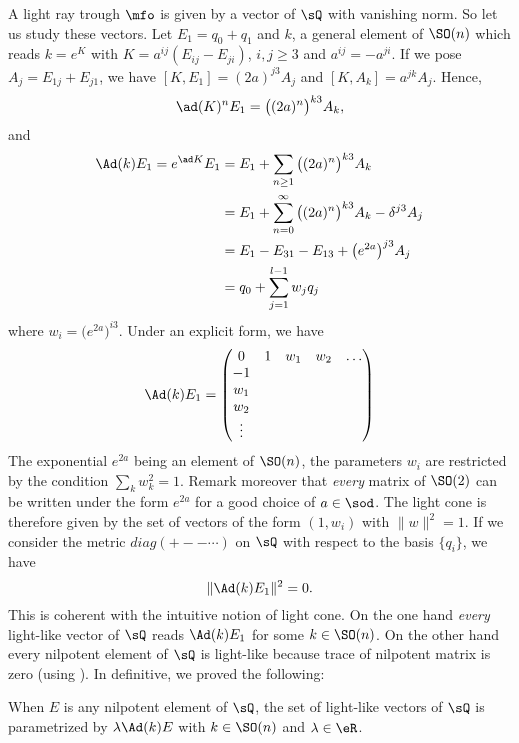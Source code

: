 A light ray trough $\mfo$ is given by a vector of $\sQ$ with vanishing norm. So let us study these vectors. Let $E_1=q_0+q_1$ and $k$, a general element of  $\SO(n)$ which reads $k= e^{K}$ with $K=a^{ij}(E_{ij}-E_{ji})$, $i,j\geq 3$ and $a^{ij}=-a^{ji}$.  If we pose $A_j=E_{1j}+E_{j1}$, we have $[K,E_1]=(2a)^{j3}A_j$ and $[K,A_k]=a^{jk}A_j$. Hence,
\[
\ad(K)^nE_1=\big((2a)^n\big)^{k3}A_k,
\]
and
\begin{equation} \label{eq:Adkeu}
\begin{split}
\Ad(k)E_1=e^{\ad K}E_1&=E_1+\sum_{n\geq 1}\big( (2a)^n\big)^{k3}A_k\\
	      &=E_1+\sum_{n=0}^{\infty}\big(  (2a)^n \big)^{k3}A_k-\delta^{j3}A_j\\
		&=E_1-E_{31}-E_{13}+\big( e^{2a}\big)^{j3}A_j\\
	      &=q_0+\sum_{j=1}^{l-1}w_jq_j
\end{split}
\end{equation}
where $w_i=\big(  e^{2a} \big)^{i3}$. Under an explicit form, we have
 \begin{equation} \label{eq:AdkE}
   \Ad(k)E_1=
\begin{pmatrix}
0&1&w_1&w_2&\ldots\\
-1\\
w_1\\
w_2\\
\vdots
\end{pmatrix}
\end{equation}
The exponential $ e^{2a}$ being an element of $\SO(n)$, the parameters $w_i$ are restricted by the condition $\sum_{k}w_k^2=1$.  Remark moreover that \emph{every} matrix of $\SO(2)$ can be written under the form $e^{2a}$ for a good choice of $a\in\sod$. The light cone is therefore given by the set of vectors of the form $(1,w_i)$ with $\|w\|^2=1$. If we consider the metric $diag(+--\cdots)$ on $\sQ$ with respect to the basis $\{q_i\}$, we have
\[
  \|\Ad(k)E_1\|^2=0.
\]
This is coherent with the intuitive notion of light cone. On the one hand \emph{every} light-like vector of $\sQ$ reads $\Ad(k)E_1$ for some $k\in\SO(n)$. On the other hand every nilpotent element of $\sQ$ is light-like because trace of nilpotent matrix is zero (using ). In definitive, we proved the following:

\begin{proposition}		\label{PropNormZeroEQnil}
When $E$ is any nilpotent element of $\sQ$, the set of light-like vectors of $\sQ$ is parametrized by $\lambda\Ad(k)E$ with $k\in\SO(n)$ and $\lambda\in\eR$.
\label{PropToutVectLumQ}
\end{proposition}

